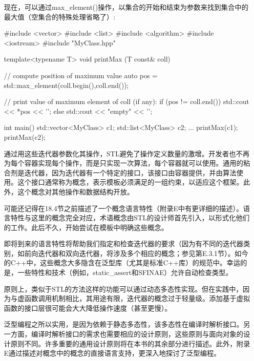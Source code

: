 现在，可以通过max\_element()操作，以集合的开始和结束为参数来找到集合中的最大值（空集合的特殊处理省略了）:

\begin{cpp}
#include <vector>
#include <list>
#include <algorithm>
#include <iostream>
#include "MyClass.hpp"

template<typename T>
void printMax (T const& coll)
{
	// compute position of maximum value
	auto pos = std::max_element(coll.begin(),coll.end());
	
	// print value of maximum element of coll (if any):
	if (pos != coll.end()) {
		std::cout << *pos << '\n';
	}
	else {
		std::cout << "empty" << '\n';
	}
}

int main()
{
	std::vector<MyClass> c1;
	std::list<MyClass> c2;
	...
	printMax(c1);
	printMax(c2);
}
\end{cpp}

通过用这些迭代器参数化其操作，STL避免了操作定义数量的激增。开发者也不再为每个容器实现每个操作，而是只实现一次算法，每个容器就可以使用。通用的粘合剂是迭代器，因为迭代器有一个特定的接口，该接口由容器提供，并由算法使用。这个接口通常称为概念，表示模板必须满足的一组约束，以适应这个框架。此外，这个概念对其他操作和数据结构开放。

可能还记得在18.4节之前描述了一个概念语言特性（附录E中有更详细的描述）。语言特性与这里的概念完全对应，术语概念由STL的设计师首先引入，以形式化他们的工作。此后不久，开始尝试在模板中明确这些概念。

即将到来的语言特性将帮助我们指定和检查迭代器的要求（因为有不同的迭代器类别，如前向迭代器和双向迭代器，将涉及多个相应的概念；参见第E.3.1节）。如今的C++中，这些概念大多隐含在泛型库（尤其是标准C++库）的规范中。幸运的是，一些特性和技术（例如，static\_assert和SFINAE）允许自动检查类型。

原则上，类似于STL的方法这样的功能可以通过动态多态性实现。但在实践中，因为与虚函数调用机制相比，其用途有限，迭代器的概念过于轻量级。添加基于虚拟函数的接口层很可能会大大降低操作速度（甚至更慢）。

泛型编程之所以实用，是因为依赖于静态多态性，该多态性在编译时解析接口。另一方面，编译时解析接口的需求也需要相应的设计原则，这些原则与面向对象的设计原则不同。许多重要的通用设计原则将在本书的其余部分进行描述。此外，附录E通过描述对概念中的概念的直接语言支持，更深入地探讨了泛型编程。























